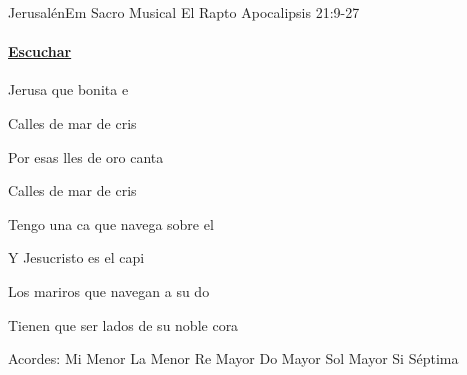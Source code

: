 \documentclass[12pt, spanish]{book}
\begin{document}
    \begin{song}{Jerusalén}{Em}
    {} %
    {Sacro Musical El Rapto}
    {Apocalipsis 21:9-27} %
    {}
        \ifChordBk
        \paragraph{\mbox{}\hfill\protect\href{https://open.spotify.com/intl-es/track/3PQgLUrO6UyKtEdPsAtkD1}{Escuchar}\mbox{}\hfill}
        \fi

        \begin{SBChorus}
            Jerusa que bonita e

            Calles de  mar de cris
        \end{SBChorus}

        \begin{SBOpGroup}
            Por esas lles de oro canta

            Calles de  mar de cris
        \end{SBOpGroup}

        \begin{SBOpGroup}
            Tengo una ca que navega sobre el 

            Y Jesucristo es el capi
        \end{SBOpGroup}

        \begin{SBOpGroup}
            Los mariros que navegan a su do

            Tienen que ser lados de su noble cora
        \end{SBOpGroup}

        \ifChordBk
        \begin{SBOpGroup}
            Acordes:\break
            \upchord{\Em}\qquad Mi Menor \hfill
            \upchord{\Am}\qquad La Menor \hfill\null\break
            \upchord{\D}\qquad Re Mayor \hfill
            \upchord{\C}\qquad Do Mayor \hfill
            \upchord{\G}\qquad Sol Mayor \hfill\null\break
            \upchord{\Bseven}\qquad Si S\'eptima \hfill\null\break
        \end{SBOpGroup}
        \fi
    \end{song}
\end{document}
